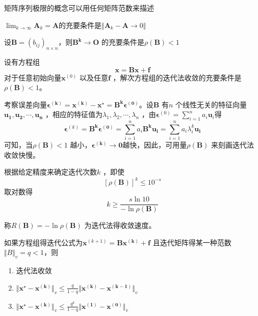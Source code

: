 \documentclass[a4paper]{article}
\begin{document}
矩阵序列极限的概念可以用任何矩阵范数来描述
\begin{theorem}
	$\lim_{k \to \infty} \mathbf{A}_k = \mathbf{A}$的充要条件是$\Vert \mathbf{A}_k - \mathbf{A} \to 0 \Vert$
\end{theorem}

\begin{theorem}
	设$\mathbf{B} = (b_{ij})_{n \times n}$，则$\mathbf{B^{k} \to O}$ 的充要条件是$\rho(\mathbf{B}) < 1$
\end{theorem}

\begin{theorem}
	设有方程组
	\[
	\mathbf{x = Bx + f} \tag{7.3.1} \label{eq:7.3.1} 
	\] 
	对于任意初始向量$\mathbf{x}^{(0)}$ 以及任意$\mathbf{f}$ ，解次方程组的迭代法收敛的充要条件是$\rho(\mathbf{B}) < 1$。
\end{theorem}

考察误差向量$\mathbf{\epsilon^{(k)} = x^{(k)} - x^{\star} = B^{k} \epsilon^{(0)}}$。设$\mathbf{B}$ 有$n$ 个线性无关的特征向量$\mathbf{u_1, u_2, \cdots, u_n}$ ，相应的特征值为$\lambda_1, \lambda_2, \cdots, \lambda_n$ ，由$\mathbf{\epsilon}^{(0)} = \sum_{i=1}^{n} a_i \mathbf{u}_i$得
\[
\mathbf{\epsilon}^{(k)} = \mathbf{B^{k} \epsilon^{(0)}} = \sum_{i=1}^{n} a_i \mathbf{B^{k}u_i} = \sum_{i=1}^{n} a_i \lambda_i^{k} \mathbf{u_i}
\] 
可知，当$\rho(\mathbf{B}) < 1$ 越小，$\mathbf{\epsilon^{(k)} \to 0}$越快，因此，可用量$\rho(\mathbf{B})$ 来刻画迭代法收敛快慢。

根据给定精度来确定迭代次数$k$ ，即使
\[
	[\rho(\mathbf{B})]^{k} \le 10^{-s} \tag{7.3.2} \label{eq:7.3.2} 
\] 
取对数得
\[
k \ge \frac{s \ln 10}{- \ln \rho(\mathbf{B})}
\] 

\begin{definition}
	称$R(\mathbf{B}) = -\ln \rho(\mathbf{B})$ 为迭代法得收敛速度。
\end{definition}

\begin{theorem}
	如果方程组得迭代公式为$\mathbf{x}^{(k+1)} = \mathbf{Bx^{(k)} + f}$ 且迭代矩阵得某一种范数$\Vert B \Vert_v = q < 1$，则
	\begin{enumerate}
		\item 迭代法收敛
		\item $\Vert \mathbf{x^{\star} - x^{(k)}} \Vert_v \le \frac{q}{1-q} \Vert \mathbf{x^{(k)} - x^{(k-1)}} \Vert_v$ 
		\item $\Vert \mathbf{x^{\star} - x^{(k)}} \Vert_v \le \frac{q^{k}}{1-q} \Vert \mathbf{x^{(1)} - x^{(0)}} \Vert_v$
	\end{enumerate}
\end{theorem}
\end{document}
